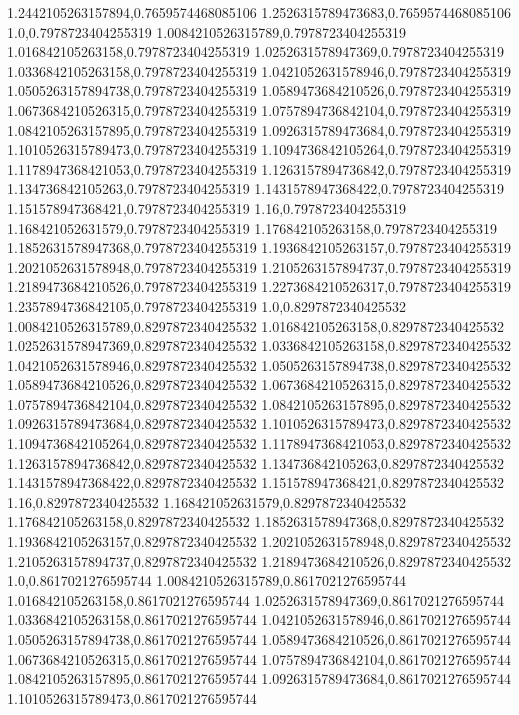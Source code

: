1.2442105263157894,0.7659574468085106
1.2526315789473683,0.7659574468085106
1.0,0.7978723404255319
1.0084210526315789,0.7978723404255319
1.016842105263158,0.7978723404255319
1.0252631578947369,0.7978723404255319
1.0336842105263158,0.7978723404255319
1.0421052631578946,0.7978723404255319
1.0505263157894738,0.7978723404255319
1.0589473684210526,0.7978723404255319
1.0673684210526315,0.7978723404255319
1.0757894736842104,0.7978723404255319
1.0842105263157895,0.7978723404255319
1.0926315789473684,0.7978723404255319
1.1010526315789473,0.7978723404255319
1.1094736842105264,0.7978723404255319
1.1178947368421053,0.7978723404255319
1.1263157894736842,0.7978723404255319
1.134736842105263,0.7978723404255319
1.1431578947368422,0.7978723404255319
1.151578947368421,0.7978723404255319
1.16,0.7978723404255319
1.168421052631579,0.7978723404255319
1.176842105263158,0.7978723404255319
1.1852631578947368,0.7978723404255319
1.1936842105263157,0.7978723404255319
1.2021052631578948,0.7978723404255319
1.2105263157894737,0.7978723404255319
1.2189473684210526,0.7978723404255319
1.2273684210526317,0.7978723404255319
1.2357894736842105,0.7978723404255319
1.0,0.8297872340425532
1.0084210526315789,0.8297872340425532
1.016842105263158,0.8297872340425532
1.0252631578947369,0.8297872340425532
1.0336842105263158,0.8297872340425532
1.0421052631578946,0.8297872340425532
1.0505263157894738,0.8297872340425532
1.0589473684210526,0.8297872340425532
1.0673684210526315,0.8297872340425532
1.0757894736842104,0.8297872340425532
1.0842105263157895,0.8297872340425532
1.0926315789473684,0.8297872340425532
1.1010526315789473,0.8297872340425532
1.1094736842105264,0.8297872340425532
1.1178947368421053,0.8297872340425532
1.1263157894736842,0.8297872340425532
1.134736842105263,0.8297872340425532
1.1431578947368422,0.8297872340425532
1.151578947368421,0.8297872340425532
1.16,0.8297872340425532
1.168421052631579,0.8297872340425532
1.176842105263158,0.8297872340425532
1.1852631578947368,0.8297872340425532
1.1936842105263157,0.8297872340425532
1.2021052631578948,0.8297872340425532
1.2105263157894737,0.8297872340425532
1.2189473684210526,0.8297872340425532
1.0,0.8617021276595744
1.0084210526315789,0.8617021276595744
1.016842105263158,0.8617021276595744
1.0252631578947369,0.8617021276595744
1.0336842105263158,0.8617021276595744
1.0421052631578946,0.8617021276595744
1.0505263157894738,0.8617021276595744
1.0589473684210526,0.8617021276595744
1.0673684210526315,0.8617021276595744
1.0757894736842104,0.8617021276595744
1.0842105263157895,0.8617021276595744
1.0926315789473684,0.8617021276595744
1.1010526315789473,0.8617021276595744
